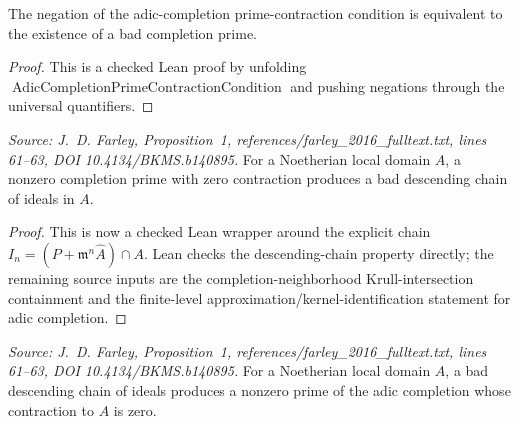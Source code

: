 \begin{lemma}
  \label{lem:not_adic_completion_prime_contraction_condition_iff_bad_prime}
  The negation of the adic-completion prime-contraction condition is
  equivalent to the existence of a bad completion prime.
\end{lemma}

\begin{proof}
  This is a checked Lean proof by unfolding
  \(\operatorname{AdicCompletionPrimeContractionCondition}\) and pushing
  negations through the universal quantifiers.
\end{proof}

\begin{lemma}
  \label{lem:adic_completion_bad_prime_to_bad_chain}
  \textit{Source: J.~D. Farley, Proposition~1,
  references/farley\_2016\_fulltext.txt, lines 61--63,
  DOI 10.4134/BKMS.b140895.}
  For a Noetherian local domain \(A\), a nonzero completion prime with zero
  contraction produces a bad descending chain of ideals in \(A\).
\end{lemma}

\begin{proof}
  This is now a checked Lean wrapper around the explicit chain
  \(I_n=(P+\mathfrak m^n\widehat A)\cap A\).  Lean checks the descending-chain
  property directly; the remaining source inputs are the
  completion-neighborhood Krull-intersection containment and the finite-level
  approximation/kernel-identification statement for adic completion.
\end{proof}

\begin{lemma}
  \label{lem:weakly_quasi_complete_bad_chain_to_adic_completion_bad_prime}
  \textit{Source: J.~D. Farley, Proposition~1,
  references/farley\_2016\_fulltext.txt, lines 61--63,
  DOI 10.4134/BKMS.b140895.}
  For a Noetherian local domain \(A\), a bad descending chain of ideals
  produces a nonzero prime of the adic completion whose contraction to \(A\)
  is zero.
\end{lemma}

